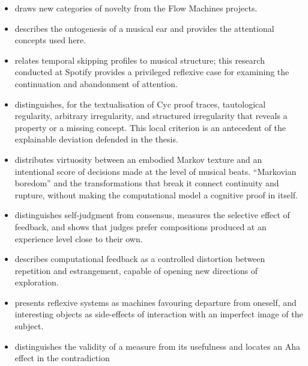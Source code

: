 \documentclass[11pt,a4paper]{article}
\begin{document}
\begin{itemize}
        \textcite{pachet2017variations} oppose statistical texture to imposed
        structure and reveal both the power and the limit of \emph{templagiarism}.
  \item \textcite{pachet2021assisted} draws new categories of novelty from the
        Flow Machines projects.
  \item \textcite{pachet2018oreille} describes the ontogenesis of a musical ear
        and provides the attentional concepts used here.
  \item \textcite{montecchio2020skipping} relates temporal skipping profiles
        to musical structure; this research conducted at Spotify provides a
        privileged reflexive case for examining the continuation and abandonment
        of attention.
  \item \textcite{milipachet1995regularity} distinguishes, for the
        textualisation of Cyc proof traces, tautological regularity, arbitrary
        irregularity, and structured irregularity that reveals a property or a
        missing concept. This local criterion is an antecedent of the
        explainable deviation defended in the thesis.
  \item \textcite{pachet2012virtuosity} distributes virtuosity between an
        embodied Markov texture and an intentional score of decisions made at
        the level of musical beats. ``Markovian boredom'' and the transformations
        that break it connect continuity and rupture, without making the
        computational model a cognitive proof in itself.
  \item \textcite{martin2016creativeprocess} distinguishes self-judgment from
        consensus, measures the selective effect of feedback, and shows that judges
        prefer compositions produced at an experience level close to their own.
  \item \textcite{jones2009stimulating} describes computational feedback as a
        controlled distortion between repetition and estrangement, capable of opening
        new directions of exploration.
  \item \textcite{pachet2008machines} presents reflexive systems as machines
        favouring departure from oneself, and interesting objects as side-effects
        of interaction with an imperfect image of the subject.\par
  \item \textcite{aucouturier2002similarity} distinguishes the validity of a
        measure from its usefulness and locates an Aha effect in the contradiction

\end{itemize}
\end{document}
